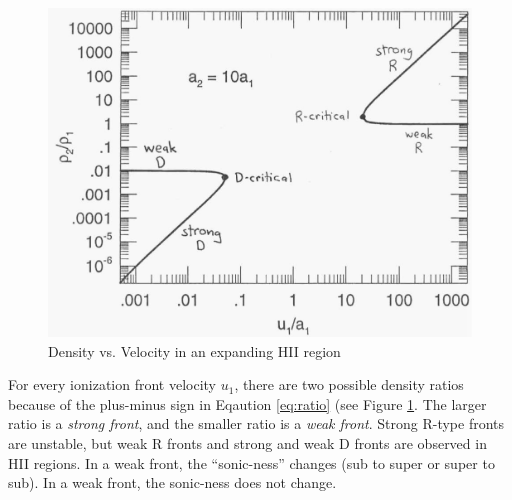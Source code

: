 \begin{figure}[!h]
\begin{center}
\includegraphics[width=\textwidth]{shock_plot.pdf}
\end{center}
\caption{Density vs. Velocity in an expanding HII region \label{fig:shock}}
\end{figure}

For every ionization front velocity $u_1$, there are two possible density ratios because of the 
plus-minus sign in Eqaution \ref{eq:ratio} (see Figure \ref{fig:shock}.  The larger ratio is a 
\emph{strong front}, and the smaller ratio is a \emph{weak front}.  Strong R-type fronts are 
unstable, but weak R fronts and strong and weak D fronts are observed in HII regions.  In a 
weak front, the ``sonic-ness'' changes (sub to super or super to sub).  In a weak front, 
the sonic-ness does not change.  

